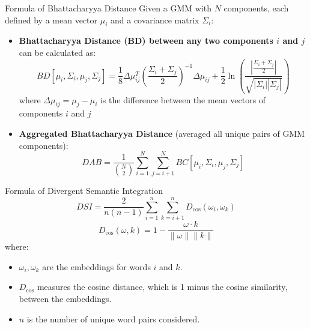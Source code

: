 \documentclass[pdf]{beamer}
\begin{document}
\begin{frame}{Formula of Bhattacharyya Distance}
Given a GMM with $N$ components, each defined by a mean vector $\mu_i$ and a covariance matrix $\Sigma_i$: 
    \begin{itemize}
        \item \textbf{Bhattacharyya Distance (BD) between any two components $i$ and $j$} can be calculated as:
            \begin{equation*}
                BD[\mu_i, \Sigma_i, \mu_j, \Sigma_j] = \frac{1}{8} \Delta\mu_{ij}^T \left(\frac{\Sigma_i + \Sigma_j}{2}\right)^{-1} \Delta\mu_{ij} + \frac{1}{2} \ln \left(\frac{|\frac{\Sigma_i + \Sigma_j}{2}|}{\sqrt{|\Sigma_i||\Sigma_j|}}\right)
            \end{equation*}
            where \(\Delta\mu_{ij} = \mu_j - \mu_i\) is the difference between the mean vectors of components \(i\) and \(j\)
        \item \textbf{Aggregated Bhattacharyya Distance} (averaged all unique pairs of GMM components):
            \begin{equation*}
                DAB = \frac{1}{\binom{N}{2}} \sum_{i=1}^{N} \sum_{j=i+1}^{N} BC[\mu_i, \Sigma_i, \mu_j, \Sigma_j]
            \end{equation*}
    \end{itemize}
\end{frame}

\begin{frame}{Formula of Divergent Semantic Integration}
\begin{equation*}
    DSI = \frac{2}{n(n-1)} \sum_{i=1}^{n} \sum_{k=i+1}^{n} D_{\text{cos}}(\omega_i, \omega_k)
\end{equation*}
\begin{equation*}
    D_{\text{cos}}(\omega, k) = 1 - \frac{\omega \cdot k}{\|\omega\| \|k\|}
\end{equation*}
where:
\begin{itemize}
    \item \(\omega_i, \omega_k\) are the embeddings for words \(i\) and \(k\).
    \item \(D_{\text{cos}}\) measures the cosine distance, which is 1 minus the cosine similarity, between the embeddings.
    \item \(n\) is the number of unique word pairs considered.
\end{itemize}
\end{frame}
\end{document}
